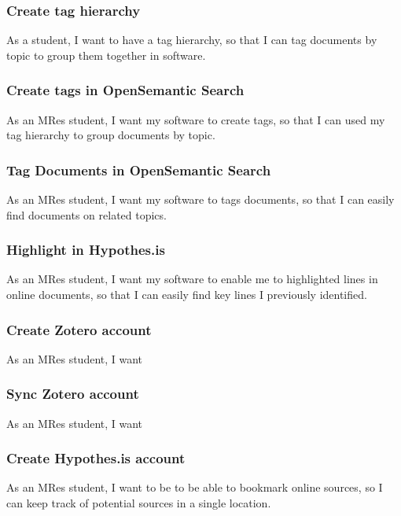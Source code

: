 \documentclass{article}
\begin{document}
\subsubsection*{Create tag hierarchy}

As a student, I want to have a tag hierarchy, so that I can tag documents by topic to group them together in software.

\subsubsection*{Create tags in OpenSemantic Search}

As an MRes student, I want my software to create tags, so that I can used my tag hierarchy to group documents by topic.

\subsubsection*{Tag Documents in OpenSemantic Search}

As an MRes student, I want my software to tags documents, so that I can easily find documents on related topics.

\subsubsection*{Highlight in Hypothes.is}

As an MRes student, I want my software to enable me to highlighted lines in online documents, so that I can easily find key lines I previously identified.

\subsubsection*{Create Zotero account}

As an MRes student, I want 

\subsubsection*{Sync Zotero account}

As an MRes student, I want

\subsubsection*{Create Hypothes.is account}

As an MRes student, I want to be to be able to bookmark online sources, so I can keep track of potential sources in a single location.
\end{document}
